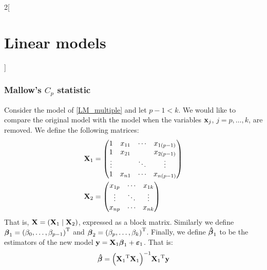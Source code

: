\documentclass[../../../main_math.tex]{subfiles}
\begin{document}
\begin{multicols}{2}[\section{Linear models}]
\begin{theorem}
  \end{theorem}
  \subsubsection{Mallow's \texorpdfstring{$C_p$}{Cp} statistic}
  \begin{definition}
    Consider the model of \cref{LM_multiple} and let $p-1<k$. We would like to compare the original model with the model when the variables $\boldsymbol{\mathrm{x}}_j$, $j=p,\ldots,k$, are removed. We define the following matrices:
    \begin{align*}
      \boldsymbol{\mathrm{X}}_1 & =\begin{pmatrix}
                    1      & x_{11} & \cdots & x_{1(p-1)} \\
                    1      & x_{21} &        & x_{2(p-1)} \\
                    \vdots &        & \ddots & \vdots     \\
                    1      & x_{n1} & \cdots & x_{n(p-1)}
                  \end{pmatrix} \\
      \boldsymbol{\mathrm{X}}_2 & =\begin{pmatrix}
                    x_{1p} & \cdots & x_{1k} \\
                    \vdots & \ddots & \vdots \\
                    x_{np} & \cdots & x_{nk}
                  \end{pmatrix}
    \end{align*}
    That is, $\boldsymbol{\mathrm{X}}=(\boldsymbol{\mathrm{X}}_1 \mid \boldsymbol{\mathrm{X}}_2)$, expressed as a block matrix. Similarly we define $\boldsymbol{\mathrm{\beta}}_1={(\beta_0,\ldots,\beta_{p-1})}^{\mathrm{T}}$ and $\boldsymbol{\mathrm{\beta}}_2={(\beta_p,\ldots,\beta_{k})}^{\mathrm{T}}$. Finally, we define $\boldsymbol{\mathrm{\hat\beta}}_1$ to be the estimators of the new model $\boldsymbol{\mathrm{y}}=\boldsymbol{\mathrm{X}}_1\boldsymbol{\mathrm{\beta}}_1+\boldsymbol{\mathrm{\varepsilon}}_1$. That is: $$\boldsymbol{\mathrm{\hat\beta}}={\left({\boldsymbol{\mathrm{X}}_1}^{\mathrm{T}}\boldsymbol{\mathrm{X}}_1\right)}^{-1}{\boldsymbol{\mathrm{X}}_1}^{\mathrm{T}}\boldsymbol{\mathrm{y}}$$

\end{definition}
\end{multicols}
\end{document}
